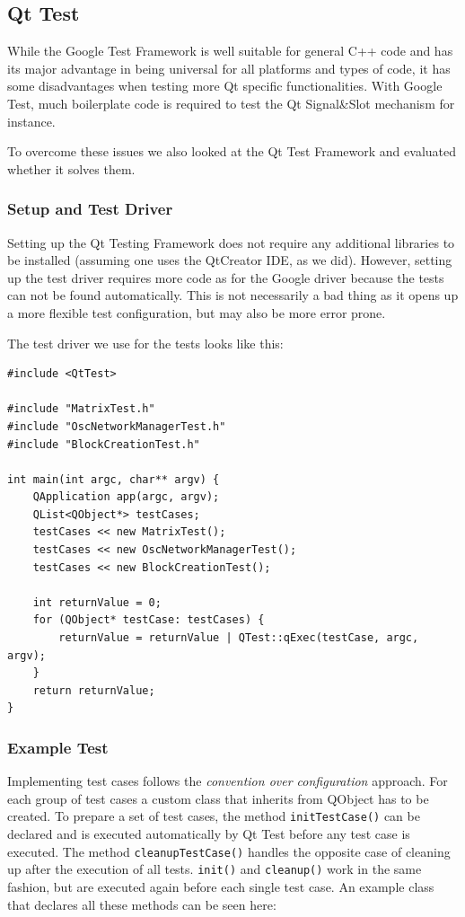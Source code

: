 \documentclass{scrreprt}
\begin{document}
\subsection{Qt Test}

While the Google Test Framework is well suitable for general C++ code and has its major advantage in being universal for all platforms and types of code, it has some disadvantages when testing more Qt specific functionalities. With Google Test, much boilerplate code is required to test the Qt Signal\&Slot mechanism for instance.

To overcome these issues we also looked at the Qt Test Framework and evaluated whether it solves them.

\subsubsection{Setup and Test Driver}

Setting up the Qt Testing Framework does not require any additional libraries to be installed (assuming one uses the QtCreator IDE, as we did). However, setting up the test driver requires more code as for the Google driver because the tests can not be found automatically. This is not necessarily a bad thing as it opens up a more flexible test configuration, but may also be more error prone.

The test driver we use for the tests looks like this:

\bigskip
\begin{lstlisting}[title=tests-qt/main.cpp]
#include <QtTest>

#include "MatrixTest.h"
#include "OscNetworkManagerTest.h"
#include "BlockCreationTest.h"

int main(int argc, char** argv) {
	QApplication app(argc, argv);	
	QList<QObject*> testCases;
	testCases << new MatrixTest();
	testCases << new OscNetworkManagerTest();
	testCases << new BlockCreationTest();
	
	int returnValue = 0;
	for (QObject* testCase: testCases) {
		returnValue = returnValue | QTest::qExec(testCase, argc, argv);
	}
	return returnValue;
}
\end{lstlisting}
\bigskip

\subsubsection{Example Test}

Implementing test cases follows the \textit{convention over configuration} approach. For each group of test cases a custom class that inherits from QObject has to be created. To prepare a set of test cases, the method \texttt{initTestCase()} can be declared and is executed automatically by Qt Test before any test case is executed. The method \texttt{cleanupTestCase()} handles the opposite case of cleaning up after the execution of all tests. \texttt{init()} and \texttt{cleanup()} work in the same fashion, but are executed again before each single test case. An example class that declares all these methods can be seen here:
\end{document}
